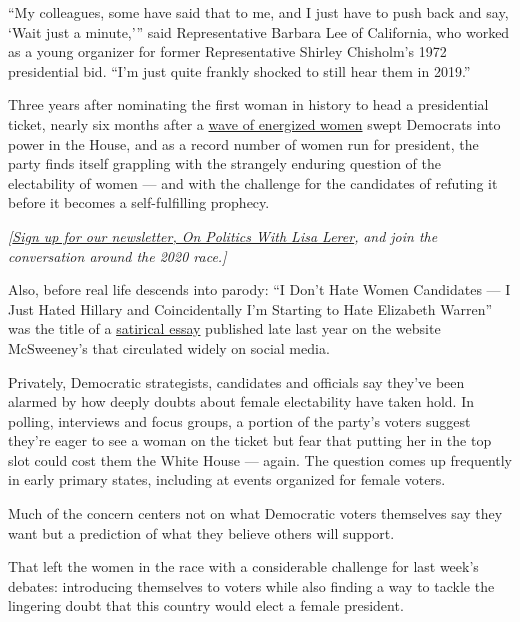 ``My colleagues, some have said that to me, and I just have to push back
and say, `Wait just a minute,''' said Representative Barbara Lee of
California, who worked as a young organizer for former Representative
Shirley Chisholm's 1972 presidential bid. ``I'm just quite frankly
shocked to still hear them in 2019.''

Three years after nominating the first woman in history to head a
presidential ticket, nearly six months after a
\href{https://www.nytimes3xbfgragh.onion/interactive/2018/11/09/us/women-elected-midterm-elections.html}{wave
of energized women} swept Democrats into power in the House, and as a
record number of women run for president, the party finds itself
grappling with the strangely enduring question of the electability of
women --- and with the challenge for the candidates of refuting it
before it becomes a self-fulfilling prophecy.

\emph{{[}}\href{https://www.nytimes3xbfgragh.onion/newsletters/politics?smid=rd?action=click\&module=Intentional\&pgtype=Article}{\emph{Sign
up for our newsletter, On Politics With Lisa Lerer}}\emph{,} \emph{and
join the conversation around the 2020 race.{]}}

Also, before real life descends into parody: ``I Don't Hate Women
Candidates --- I Just Hated Hillary and Coincidentally I'm Starting to
Hate Elizabeth Warren'' was the title of a
\href{https://www.mcsweeneys.net/articles/i-dont-hate-women-candidates-i-just-hated-hillary-and-coincidentally-im-starting-to-hate-elizabeth-warren}{satirical
essay} published late last year on the website McSweeney's that
circulated widely on social media.

Privately, Democratic strategists, candidates and officials say they've
been alarmed by how deeply doubts about female electability have taken
hold. In polling, interviews and focus groups, a portion of the party's
voters suggest they're eager to see a woman on the ticket but fear that
putting her in the top slot could cost them the White House --- again.
The question comes up frequently in early primary states, including at
events organized for female voters.

Much of the concern centers not on what Democratic voters themselves say
they want but a prediction of what they believe others will support.

That left the women in the race with a considerable challenge for last
week's debates: introducing themselves to voters while also finding a
way to tackle the lingering doubt that this country would elect a female
president.

